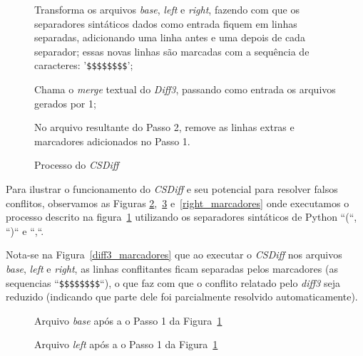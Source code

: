 \begin{figure}[ht]
	\begin{center}
		\begin{compactenum}[(1)]
            \item Transforma os arquivos \emph{base}, \emph{left} e
                \emph{right}, fazendo com que os separadores sintáticos dados
                como entrada fiquem em linhas separadas, adicionando uma linha
                antes e uma depois de cada separador; essas novas linhas são
                marcadas com a sequência de caracteres: '\verb|$$$$$$$$|';
            \item Chama o \emph{merge} textual do \emph{Diff3}, passando como
                entrada os arquivos gerados por 1;
            \item No arquivo resultante do Passo 2, remove as linhas extras e
                marcadores adicionados no Passo 1.
		\end{compactenum}
	\end{center}
	\caption{Processo do \emph{CSDiff}}\label{csdiff_process}
\end{figure}


Para ilustrar o funcionamento do \emph{CSDiff} e seu potencial para resolver
falsos conflitos, observamos as Figuras
\ref{base_marcadores},~\ref{left_marcadores} e~\ref{right_marcadores} onde
executamos o processo descrito na figura~\ref{csdiff_process} utilizando os
separadores sintáticos de Python ``(``, ``)``  e ``,``.

Nota-se na Figura~\ref{diff3_marcadores} que ao executar o \emph{CSDiff} nos
arquivos \emph{base}, \emph{left} e \emph{right}, as linhas conflitantes ficam
separadas pelos marcadores (as sequencias ``\verb|$$$$$$$$|``), o que faz com que
o conflito relatado pelo \emph{diff3} seja reduzido (indicando que parte dele
foi parcialmente resolvido automaticamente).

\begin{figure}[ht]
	\begin{center}
        
        \caption{Arquivo \emph{base} após a o Passo 1 da
        Figura~\ref{csdiff_process}}\label{base_marcadores}
	\end{center}
\end{figure}

\begin{figure}[ht]
	\begin{center}
		
        \caption{Arquivo \emph{left} após a o Passo 1 da
        Figura~\ref{csdiff_process}}\label{left_marcadores}
	\end{center}
\end{figure}

